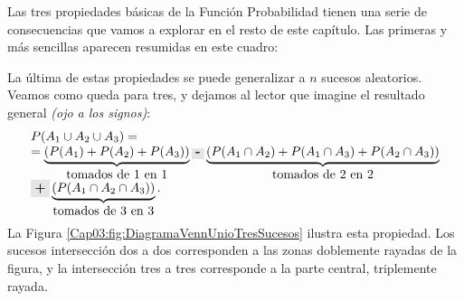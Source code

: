 Las tres propiedades básicas de la Función Probabilidad tienen una serie de consecuencias que vamos a explorar en el resto de este capítulo. Las primeras y más sencillas aparecen resumidas en este cuadro:	
    \begin{center}
    \end{center}
La última de estas propiedades se puede generalizar a $n$ sucesos aleatorios. Veamos como queda para tres, y dejamos al lector que imagine el resultado general {\em (ojo a los signos)}:
    \[\begin{array}{l}
    P(A_1\cup A_2\cup A_3)=\\
    =\underbrace{\left(P(A_1)+P(A_2)+P(A_3)\right)}_{\mbox{tomados de 1 en 1}}\colorbox{lightgrey}{\bf -}\underbrace{\left(P(A_1\cap A_2)+P(A_1\cap A_3)+P(A_2\cap A_3)\right)}_{\mbox{tomados de 2 en 2}}\\
    \colorbox{lightgrey}{\bf +}\underbrace{\left(P(A_1\cap A_2\cap A_3)\right)}_{\mbox{tomados de 3 en 3}}.
    \end{array}
    \]
La Figura \ref{Cap03:fig:DiagramaVennUnioTresSucesos} ilustra esta propiedad. Los sucesos intersección dos a dos corresponden a las zonas doblemente rayadas de la figura, y la intersección tres a tres corresponde a la parte central, triplemente rayada.


